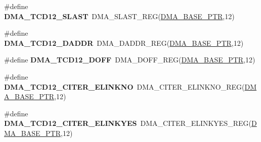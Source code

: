 \begin{DoxyCompactItemize}
\item 
\hypertarget{group___d_m_a___register___accessor___macros_ga37b08111761d48e8fcbd24b77c8bbec9}{}\#define {\bfseries D\+M\+A\+\_\+\+T\+C\+D12\+\_\+\+S\+L\+A\+S\+T}~D\+M\+A\+\_\+\+S\+L\+A\+S\+T\+\_\+\+R\+E\+G(\hyperlink{group___d_m_a___peripheral_ga6997fbc1b1973e9f27170217a3bd6f22}{D\+M\+A\+\_\+\+B\+A\+S\+E\+\_\+\+P\+T\+R},12)\label{group___d_m_a___register___accessor___macros_ga37b08111761d48e8fcbd24b77c8bbec9}

\item 
\hypertarget{group___d_m_a___register___accessor___macros_ga90f1085c61194e55a2a6367d7d03ff29}{}\#define {\bfseries D\+M\+A\+\_\+\+T\+C\+D12\+\_\+\+D\+A\+D\+D\+R}~D\+M\+A\+\_\+\+D\+A\+D\+D\+R\+\_\+\+R\+E\+G(\hyperlink{group___d_m_a___peripheral_ga6997fbc1b1973e9f27170217a3bd6f22}{D\+M\+A\+\_\+\+B\+A\+S\+E\+\_\+\+P\+T\+R},12)\label{group___d_m_a___register___accessor___macros_ga90f1085c61194e55a2a6367d7d03ff29}

\item 
\hypertarget{group___d_m_a___register___accessor___macros_gad80b977b0e363070cc25f99053dd7a77}{}\#define {\bfseries D\+M\+A\+\_\+\+T\+C\+D12\+\_\+\+D\+O\+F\+F}~D\+M\+A\+\_\+\+D\+O\+F\+F\+\_\+\+R\+E\+G(\hyperlink{group___d_m_a___peripheral_ga6997fbc1b1973e9f27170217a3bd6f22}{D\+M\+A\+\_\+\+B\+A\+S\+E\+\_\+\+P\+T\+R},12)\label{group___d_m_a___register___accessor___macros_gad80b977b0e363070cc25f99053dd7a77}

\item 
\hypertarget{group___d_m_a___register___accessor___macros_ga4fbff5cf590769e3d1046d61c9374be2}{}\#define {\bfseries D\+M\+A\+\_\+\+T\+C\+D12\+\_\+\+C\+I\+T\+E\+R\+\_\+\+E\+L\+I\+N\+K\+N\+O}~D\+M\+A\+\_\+\+C\+I\+T\+E\+R\+\_\+\+E\+L\+I\+N\+K\+N\+O\+\_\+\+R\+E\+G(\hyperlink{group___d_m_a___peripheral_ga6997fbc1b1973e9f27170217a3bd6f22}{D\+M\+A\+\_\+\+B\+A\+S\+E\+\_\+\+P\+T\+R},12)\label{group___d_m_a___register___accessor___macros_ga4fbff5cf590769e3d1046d61c9374be2}

\item 
\hypertarget{group___d_m_a___register___accessor___macros_ga290c8f3a36c751db0532836878131db6}{}\#define {\bfseries D\+M\+A\+\_\+\+T\+C\+D12\+\_\+\+C\+I\+T\+E\+R\+\_\+\+E\+L\+I\+N\+K\+Y\+E\+S}~D\+M\+A\+\_\+\+C\+I\+T\+E\+R\+\_\+\+E\+L\+I\+N\+K\+Y\+E\+S\+\_\+\+R\+E\+G(\hyperlink{group___d_m_a___peripheral_ga6997fbc1b1973e9f27170217a3bd6f22}{D\+M\+A\+\_\+\+B\+A\+S\+E\+\_\+\+P\+T\+R},12)\label{group___d_m_a___register___accessor___macros_ga290c8f3a36c751db0532836878131db6}


\end{DoxyCompactItemize}
